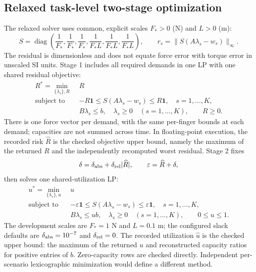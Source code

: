 \documentclass{article}
\begin{document}
\subsection{Relaxed task-level two-stage optimization}
The relaxed solver uses common, explicit scales $F_*>0$ (N) and $L>0$ (m):
\begin{equation}
 S=\operatorname{diag}\!\left(\frac1{F_*},\frac1{F_*},\frac1{F_*},
 \frac1{F_*L},\frac1{F_*L},\frac1{F_*L}\right),\qquad
 r_s=\|S(A\lambda_s-w_s)\|_\infty.
\label{eq:scale}
\end{equation}
The residual is dimensionless and does not equate force error with torque error in unscaled SI units. Stage 1 includes all required demands in one LP with one shared residual objective:
\begin{equation}
 \begin{aligned}
 R^*=\min_{\{\lambda_s\},R}\;&R\\
 \text{subject to }&-R\mathbf1\le S(A\lambda_s-w_s)\le R\mathbf1,\quad s=1,\ldots,K,\\
 &B\lambda_s\le b,\quad\lambda_s\ge0\quad(s=1,\ldots,K),\qquad R\ge0.
 \end{aligned}
\label{eq:relaxed-one}
\end{equation}
There is one force vector per demand, with the same per-finger bounds at each demand; capacities are not summed across time. In floating-point execution, the recorded risk $\widehat R$ is the checked objective upper bound, namely the maximum of the returned $R$ and the independently recomputed worst residual. Stage 2 fixes
\begin{equation}
 \delta=\delta_{\rm abs}+\delta_{\rm rel}|\widehat R|,\qquad \varepsilon=\widehat R+\delta,
\label{eq:radius}
\end{equation}
then solves one shared-utilization LP:
\begin{equation}
 \begin{aligned}
 u^*=\min_{\{\lambda_s\},u}\;&u\\
 \text{subject to }&-\varepsilon\mathbf1\le S(A\lambda_s-w_s)\le\varepsilon\mathbf1,
                       \quad s=1,\ldots,K,\\
 &B\lambda_s\le u b,\quad\lambda_s\ge0\quad(s=1,\ldots,K),\qquad 0\le u\le1.
 \end{aligned}
\label{eq:relaxed-two}
\end{equation}
The development scales are $F_*=1$ N and $L=0.1$ m; the configured slack defaults are $\delta_{\rm abs}=10^{-7}$ and $\delta_{\rm rel}=0$. The recorded utilization $\widehat u$ is the checked upper bound: the maximum of the returned $u$ and reconstructed capacity ratios for positive entries of $b$. Zero-capacity rows are checked directly. Independent per-scenario lexicographic minimization would define a different method.
\end{document}
